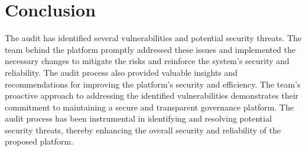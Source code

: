 \documentclass[11pt]{article}
\begin{document}
\section{Conclusion}

The audit has identified several vulnerabilities and potential security threats.
The team behind the platform promptly addressed these issues and implemented the necessary changes to mitigate the risks and reinforce the system's security and reliability.
The audit process also provided valuable insights and recommendations for improving the platform's security and efficiency.
The team's proactive approach to addressing the identified vulnerabilities demonstrates their commitment to maintaining a secure and transparent governance platform.
The audit process has been instrumental in identifying and resolving potential security threats, thereby enhancing the overall security and reliability of the proposed platform.
\end{document}

